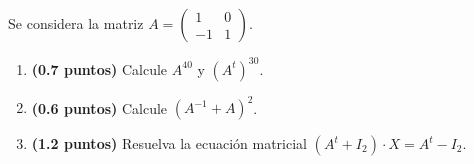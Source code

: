 
Se considera la matriz $A=\begin{pmatrix}1&0\\-1&1\end{pmatrix}$.
\begin{enumerate}[label=\alph*)]
  \item \textbf{(0.7 puntos)} Calcule $A^{40}$ y $(A^t)^{30}$.
  \item \textbf{(0.6 puntos)} Calcule $(A^{-1}+A)^2$.
  \item \textbf{(1.2 puntos)} Resuelva la ecuación matricial
  $(A^t+I_2)\cdot X=A^t-I_2$.
\end{enumerate}
